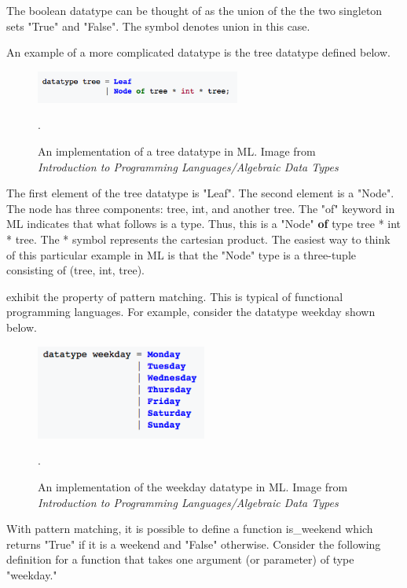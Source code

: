 \documentclass[../../main/main.tex]{subfiles}
\begin{document}
The boolean datatype can be thought of as the union of the the two singleton sets "True" and "False".  The \textbar symbol denotes union in this case.  

An example of a more complicated datatype is the tree datatype defined below.

\begin{figure}[h]
\centering
\includegraphics[width=0.6\textwidth]{../figures/tree}
\caption{\label{tree} An implementation of a tree datatype in ML.  Image from \textit{Introduction to Programming Languages/Algebraic Data Types} \cite{types} }.  
\end{figure}

The first element of the tree datatype is "Leaf".  The second element is a "Node".  The node has three components: tree, int, and another tree.  The "of" keyword in ML indicates that what follows is a type.  Thus, this is a "Node" \textbf{of} type tree * int * tree.  The * symbol represents the cartesian product.  The easiest way to think of this particular example in ML is that the "Node" type is a three-tuple consisting of (tree, int, tree).

 exhibit the property of pattern matching.  This is typical of functional programming languages.  For example, consider the datatype weekday shown below.

\begin{figure}[h]
\centering
\includegraphics[width=0.5\textwidth]{../figures/weekday}
\caption{\label{weekday} An implementation of the weekday datatype in ML.  Image from \textit{Introduction to Programming Languages/Algebraic Data Types} \cite{types} }.  
\end{figure}

With pattern matching, it is possible to define a function is_weekend which returns "True" if it is a weekend and "False" otherwise.  Consider the following definition for a function that takes one argument (or parameter) of type "weekday."
\end{document}
